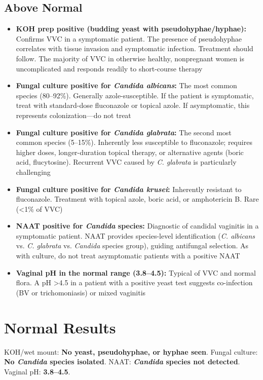 \subsection*{Above Normal}
\begin{itemize}
  \item \textbf{KOH prep positive (budding yeast with pseudohyphae/hyphae):} Confirms VVC in a symptomatic patient. The presence of pseudohyphae correlates with tissue invasion and symptomatic infection. Treatment should follow. The majority of VVC in otherwise healthy, nonpregnant women is uncomplicated and responds readily to short-course therapy
  \item \textbf{Fungal culture positive for \textit{Candida albicans}:} The most common species (80--92\%). Generally azole-susceptible. If the patient is symptomatic, treat with standard-dose fluconazole or topical azole. If asymptomatic, this represents colonization---do not treat
  \item \textbf{Fungal culture positive for \textit{Candida glabrata}:} The second most common species (5--15\%). Inherently less susceptible to fluconazole; requires higher doses, longer-duration topical therapy, or alternative agents (boric acid, flucytosine). Recurrent VVC caused by \textit{C. glabrata} is particularly challenging
  \item \textbf{Fungal culture positive for \textit{Candida krusei}:} Inherently resistant to fluconazole. Treatment with topical azole, boric acid, or amphotericin B. Rare (<1\% of VVC)
  \item \textbf{NAAT positive for \textit{Candida} species:} Diagnostic of candidal vaginitis in a symptomatic patient. NAAT provides species-level identification (\textit{C. albicans} vs. \textit{C. glabrata} vs. \textit{Candida} species group), guiding antifungal selection. As with culture, do not treat asymptomatic patients with a positive NAAT
  \item \textbf{Vaginal pH in the normal range (3.8--4.5):} Typical of VVC and normal flora. A pH >4.5 in a patient with a positive yeast test suggests co-infection (BV or trichomoniasis) or mixed vaginitis
\end{itemize}

\section*{Normal Results}
KOH/wet mount: \textbf{No yeast, pseudohyphae, or hyphae seen}. Fungal culture: \textbf{No \textit{Candida} species isolated}. NAAT: \textbf{\textit{Candida} species not detected}. Vaginal pH: \textbf{3.8--4.5}.

